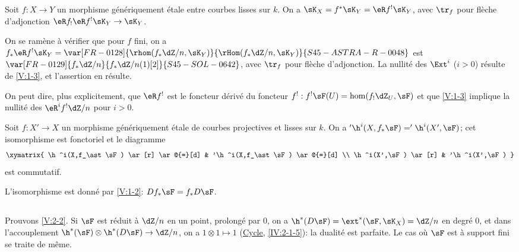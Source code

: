 \begin{lemma_}\label{V:2-3}
Soit $f:X\to Y$ un morphisme génériquement étale entre courbes lisses sur 
$k$. On a $\sK_X=f^\ast\sK_Y=\eR f^!\sK_Y$, avec $\tr_f$ pour flèche 
d'adjonction $\eR f_!\eR f^!\sK_Y\to \sK_Y$.
\end{lemma_}

On se ramène à vérifier que pour $f$ fini, on a 
$f_\ast \eR f^!\sK_Y = \var[FR-0128]{\rhom(f_\ast\dZ/n,\sK_Y)}{\rHom(f_\ast\dZ/n,\sK_Y)}{S45-ASTRA-R-0048}$ est $\var[FR-0129]{f_\ast\dZ/n}{f_\ast\dZ/n(1)[2]}{S45-SOL-0642}$, avec $\tr_f$ 
pour flèche d'adjonction. La nullité des $\Ext^i$ ($i>0$) résulte de 
\ref{V:1-3}, et l'assertion en résulte. 

On peut dire, plus explicitement, que $\eR f^!$ est le foncteur dérivé du 
foncteur $f^!:f^!\sF(U)=\hom(f_!\dZ_U,\sF)$ et que \ref{V:1-3} implique la 
nullité des $\eR^i f^!\dZ/n$ pour $i>0$.





\begin{corollary_}\label{V:2-4}
Soit $f:X'\to X$ un morphisme génériquement étale de courbes 
projectives et lisses sur $k$. On a $'\h^i(X,f_\ast \sF)='\h^i(X',\sF)$; cet 
isomorphisme est fonctoriel et le diagramme 
\[\xymatrix{
  \h^i(X,f_\ast\sF) \ar[r] \ar@{=}[d] 
    & '\h^i(X,f_\ast\sF) \ar@{=}[d] \\
  \h^i(X',\sF) \ar[r] 
    & '\h^i(X',\sF) 
}\]
est commutatif.
\end{corollary_}

L'isomorphisme est donné par \ref{V:1-2}: $D f_\ast\sF=f_\ast D\sF$. 





\subsection{}\label{V:2-5}

Prouvons \ref{V:2-2}. Si $\sF$ est réduit à $\dZ/n$ en un point, prolongé 
par $0$, on a $\h^*(D\sF) = \ext^*(\sF,\sK_X)=\dZ/n$ en degré 
$0$, et dans l'accouplement $\h^*(\sF)\otimes\h^*(D\sF) \to \dZ/n$, 
on a $1\otimes 1\mapsto 1$ (\hyperref[IV]{Cycle}, \ref{IV:2-1-5}): la dualité 
est parfaite. Le cas où $\sF$ est à support fini se traite de même. 

